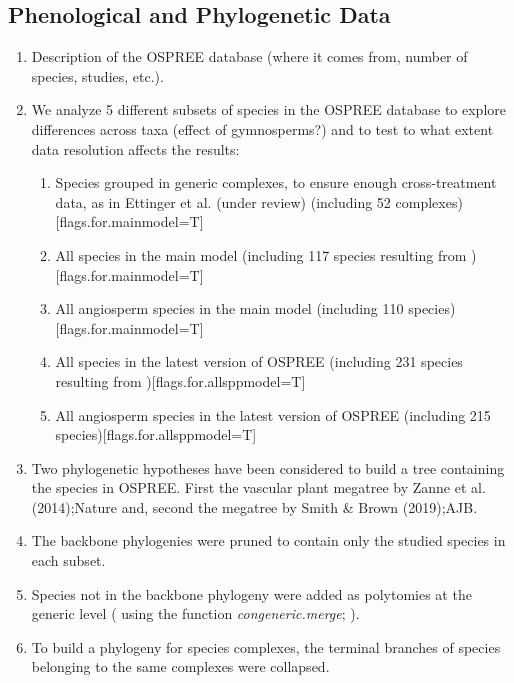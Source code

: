 \documentclass{article}\usepackage[]{graphicx}\usepackage[]{color}
\begin{document}
\subsection*{Phenological and Phylogenetic Data}
\begin{enumerate}
\item Description of the OSPREE database (where it comes from, number of species, studies, etc.).  

\item We analyze 5 different subsets of species in the OSPREE database to explore differences across taxa (effect of gymnosperms?) and to test to what extent data resolution affects the results:

\begin{enumerate}
\item Species grouped in generic complexes, to ensure enough cross-treatment data, as in Ettinger et al. (under review) (including 52 complexes)[flags.for.mainmodel=T]
\item All species in the main model (including 117 species resulting from )[flags.for.mainmodel=T]
\item All angiosperm species in the main model (including 110 species)[flags.for.mainmodel=T]
\item All species in the latest version of OSPREE (including 231 species resulting from )[flags.for.allsppmodel=T]
\item All angiosperm species in the latest version of OSPREE (including 215 species)[flags.for.allsppmodel=T]
\end{enumerate}

\item Two phylogenetic hypotheses have been considered to build a tree containing the species in OSPREE. First the vascular plant megatree by Zanne et al. (2014);Nature and, second the megatree by Smith \& Brown (2019);AJB. 

\item The backbone phylogenies were pruned to contain only the studied species in each subset.  

\item Species not in the backbone phylogeny were added as polytomies at the generic level ( using the function \emph{congeneric.merge}; \citep{pearse2015pez}).  

\item To build a phylogeny for species complexes, the terminal branches of species belonging to the same complexes were collapsed.  

\end{enumerate}
\end{document}
